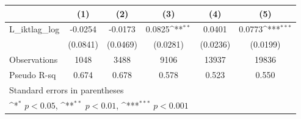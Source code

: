 {
\def\sym#1{\ifmmode^{#1}\else\(^{#1}\)\fi}
\begin{tabular}{l*{5}{c}}
\hline\hline
                &\multicolumn{1}{c}{(1)}         &\multicolumn{1}{c}{(2)}         &\multicolumn{1}{c}{(3)}         &\multicolumn{1}{c}{(4)}         &\multicolumn{1}{c}{(5)}         \\
\hline
L\_iktlag\_log    &  -0.0254         &  -0.0173         &   0.0825\sym{**} &   0.0401         &   0.0773\sym{***}\\
                & (0.0841)         & (0.0469)         & (0.0281)         & (0.0236)         & (0.0199)         \\
\hline
Observations    &     1048         &     3488         &     9106         &    13937         &    19836         \\
Pseudo R-sq     &    0.674         &    0.678         &    0.578         &    0.523         &    0.550         \\
\hline\hline
\multicolumn{6}{l}{\footnotesize Standard errors in parentheses}\\
\multicolumn{6}{l}{\footnotesize \sym{*} \(p<0.05\), \sym{**} \(p<0.01\), \sym{***} \(p<0.001\)}\\
\end{tabular}
}
